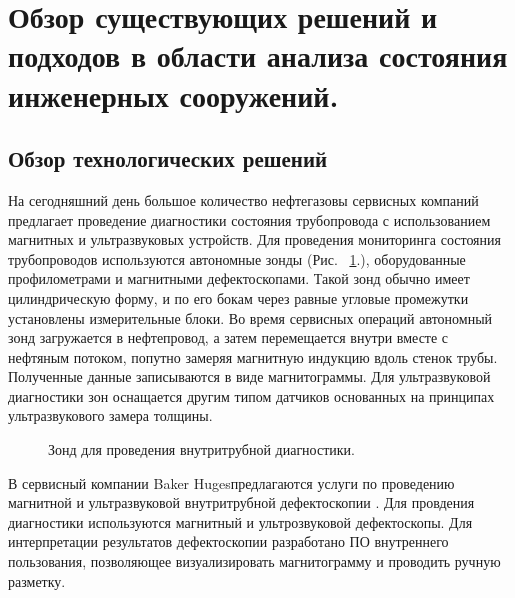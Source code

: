\documentclass[a4paper,article,14pt]{extarticle}
\begin{document}
\pagebreak
\section{Обзор существующих решений и подходов в области анализа состояния инженерных сооружений.}

\subsection{Обзор технологических решений}

На сегодняшний день большое количество нефтегазовы сервисных компаний предлагает проведение диагностики состояния 
трубопровода с использованием магнитных и ультразвуковых устройств. Для проведения мониторинга состояния трубопроводов 
используются автономные зонды (Рис. ~\ref{image1}.), оборудованные профилометрами и магнитными дефектоскопами. Такой зонд обычно имеет 
цилиндрическую форму, и по его бокам через равные угловые промежутки установлены измерительные блоки. Во время сервисных 
операций автономный зонд загружается в нефтепровод, а затем перемещается внутри вместе с нефтяным потоком, попутно замеряя 
магнитную индукцию вдоль стенок трубы. Полученные данные записываются в виде магнитограммы. Для ультразвуковой диагностики зон 
оснащается другим типом датчиков основанных на принципах ультразвукового замера толщины.

\begin{figure}[ht]
    \begin{center}
    
    \caption{
    \label{image1}
    Зонд для проведения внутритрубной диагностики.}
    \end {center}
\end {figure}

В сервисный компании \frqq Baker Huges\flqq предлагаются услуги по проведению магнитной и ультразвуковой внутритрубной дефектоскопии \cite{s2}.
Для провдения диагностики используются магнитный и ультрозвуковой дефектоскопы. Для интерпретации результатов дефектоскопии 
разработано ПО внутреннего пользования, позволяющее визуализировать магнитограмму и проводить ручную разметку.
\end{document}
